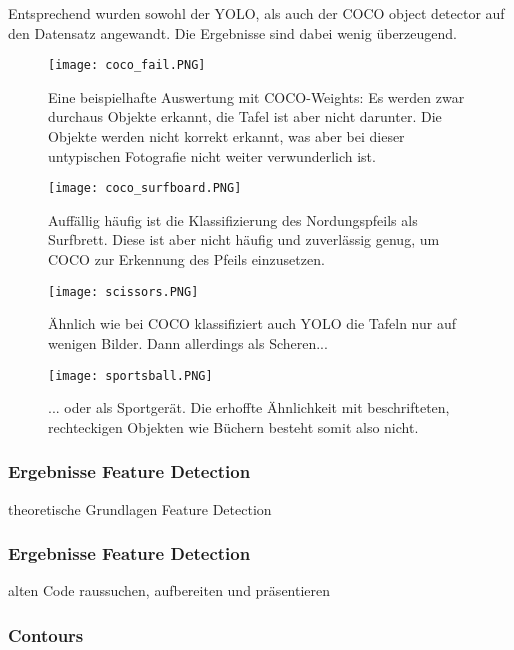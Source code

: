 Entsprechend wurden sowohl der YOLO, als auch der COCO object detector auf den Datensatz angewandt. Die Ergebnisse sind dabei wenig überzeugend.

\begin{SCfigure}[0.75][h!]
\caption{Eine beispielhafte Auswertung mit COCO-Weights: Es werden zwar durchaus Objekte erkannt, die Tafel ist aber nicht darunter. Die Objekte werden nicht korrekt erkannt, was aber bei dieser untypischen Fotografie nicht weiter verwunderlich ist.}
\texttt{[image: coco\_fail.PNG]}
\end{SCfigure}

\begin{SCfigure}[0.75][h!]
\caption{Auffällig häufig ist die Klassifizierung des Nordungspfeils als Surfbrett. Diese ist aber nicht häufig und zuverlässig genug, um COCO zur Erkennung des Pfeils einzusetzen.}
\texttt{[image: coco\_surfboard.PNG]}
\end{SCfigure}

\begin{SCfigure}[0.75][h!]
\caption{Ähnlich wie bei COCO klassifiziert auch YOLO die Tafeln nur auf wenigen Bilder. Dann allerdings als Scheren...}
\texttt{[image: scissors.PNG]}
\end{SCfigure}

\begin{SCfigure}[0.75][h!]
\caption{... oder als Sportgerät. Die erhoffte Ähnlichkeit mit beschrifteten, rechteckigen Objekten wie Büchern besteht somit also nicht.}
\texttt{[image: sportsball.PNG]}
\end{SCfigure}

\subsubsection{Ergebnisse Feature Detection}

theoretische Grundlagen Feature Detection\\

\subsubsection{Ergebnisse Feature Detection}

alten Code raussuchen, aufbereiten und präsentieren\\

\subsubsection{Contours}

